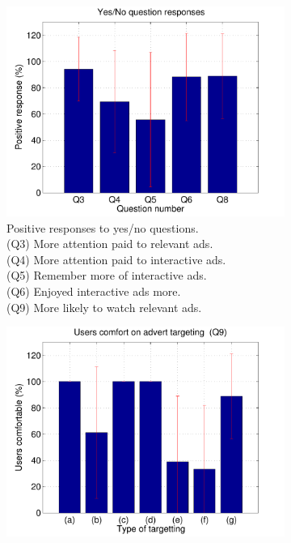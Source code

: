 	\begin{figure}[h!]
		\centering
		\begin{subfigure}[t]{0.49\textwidth}
			\centering
			\includegraphics[width=\textwidth]{images/yesno_results.pdf}
			\caption{Positive responses to yes/no questions. \\
				(Q3) More attention paid to relevant ads. \\
				(Q4) More attention paid to interactive ads. \\
				(Q5) Remember more of interactive ads. \\
				(Q6) Enjoyed interactive ads more. \\
				(Q9) More likely to watch relevant ads.
			}
			\label{fig:yesno_results}
		\end{subfigure}
		\begin{subfigure}[t]{0.49\textwidth}
			\centering
			\includegraphics[width=\textwidth]{images/targeting.pdf}

\end{subfigure}
\end{figure}
